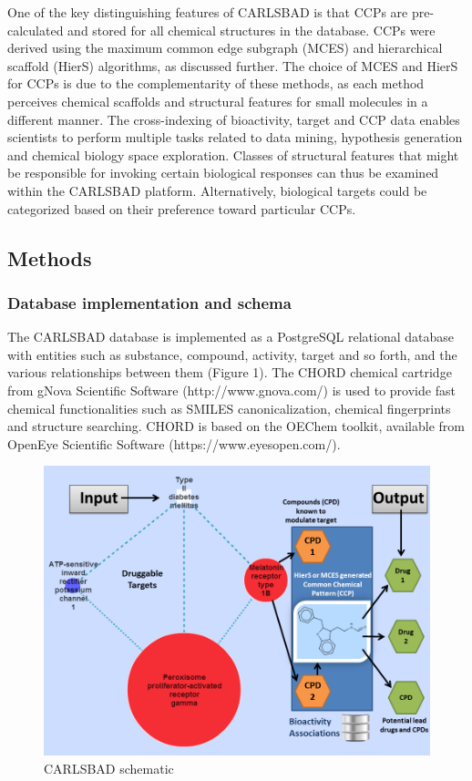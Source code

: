 One of the key distinguishing features of CARLSBAD is that CCPs are pre-calculated and stored for all chemical structures in the database. CCPs were derived using the maximum common edge subgraph (MCES) and hierarchical scaffold (HierS) algorithms, as discussed further. The choice of MCES and HierS for CCPs is due to the complementarity of these methods, as each method perceives chemical scaffolds and structural features for small molecules in a different manner. The cross-indexing of bioactivity, target and CCP data enables scientists to perform multiple tasks related to data mining, hypothesis generation and chemical biology space exploration. Classes of structural features that might be responsible for invoking certain biological responses can thus be examined within the CARLSBAD platform. Alternatively, biological targets could be categorized based on their preference toward particular CCPs.

\subsection{Methods}

\subsubsection{Database implementation and schema}

The CARLSBAD database is implemented as a PostgreSQL relational database with entities such as substance, compound, activity, target and so forth, and the various relationships between them (Figure 1). The CHORD chemical cartridge from gNova Scientific Software (http://www.gnova.com/) is used to provide fast chemical functionalities such as SMILES canonicalization\cite{Weininger1989-kh}, chemical fingerprints and structure searching. CHORD is based on the OEChem toolkit, available from OpenEye Scientific Software (https://www.eyesopen.com/).

\begin{figure}
    \centering
    \includegraphics[width=\textwidth]{figures/carlsbad/CB1_Screenshots.png}
    \caption{CARLSBAD schematic}
    \label{fig:cb_schematic}
\end{figure}

